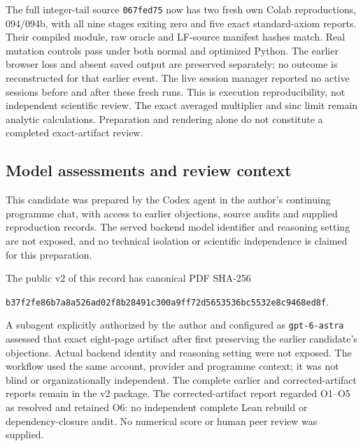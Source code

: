 \documentclass[11pt]{article}
\begin{document}
The full integer-tail source \texttt{067fed75} now has two fresh own Colab
reproductions, 094/094b, with all nine stages exiting zero and five exact
standard-axiom reports. Their compiled module, raw oracle and LF-source
manifest hashes match. Real mutation controls pass under both normal and
optimized Python. The earlier browser loss and absent saved output are
preserved separately; no outcome is reconstructed for that earlier event.
The live session manager reported no active sessions before and after these
fresh runs. This is execution reproducibility, not independent scientific
review. The exact averaged multiplier and sinc limit remain analytic
calculations. Preparation and rendering alone do not constitute a completed
exact-artifact review.
\bigskip
\subsection*{Model assessments and review context}
This candidate was prepared by the Codex agent in the author's continuing
programme chat, with access to earlier objections, source audits and supplied
reproduction records. The served backend model identifier and reasoning
setting are not exposed, and no technical isolation or scientific independence
is claimed for this preparation.

The public v2 of this record has canonical PDF SHA-256
\begin{center}\small\texttt{b37f2fe86b7a8a526ad02f8b28491c300a9ff72d5653536bc5532e8c9468ed8f}.\end{center}
A subagent explicitly authorized by the author and configured as
\texttt{gpt-6-astra} assessed that exact eight-page artifact after first
preserving the earlier candidate's objections. Actual backend identity and
reasoning setting were not exposed. The workflow used the same account,
provider and programme context; it was not blind or organizationally
independent. The complete earlier and corrected-artifact reports remain in
the v2 package. The corrected-artifact report regarded O1--O5 as resolved
and retained O6: no independent complete Lean rebuild or dependency-closure
audit. No numerical score or human peer review was supplied.
\end{document}
